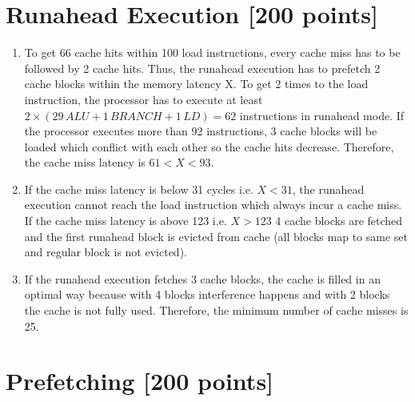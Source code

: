\documentclass[a4paper]{article}
\begin{document}
\section{Runahead Execution [200 points]}

\begin{enumerate}[label=\alph*)]
    \item To get 66 cache hits within 100 load instructions, every cache miss has
        to be followed by 2 cache hits. Thus, the runahead execution has to
        prefetch 2 cache blocks within the memory latency X. To get 2 times to
        the load instruction, the processor has to execute at least $2 \times
        (29 \, ALU + 1 \, BRANCH + 1 \, LD) = 62$ instructions in runahead mode.
        If the processor executes more than 92 instructions, 3 cache blocks
        will be loaded which conflict with each other so the cache hits
        decrease. Therefore, the cache miss latency is $61 < X < 93$.

    \item If the cache miss latency is below 31 cycles i.e. $X < 31$, the
        runahead execution cannot reach the load instruction which always
        incur a cache miss. If the cache miss latency is above 123 i.e. $X
        > 123$ 4 cache blocks are fetched and the first runahead block is
        evicted from cache (all blocks map to same set and regular block is not
        evicted).
    \item If the runahead execution fetches 3 cache blocks, the cache is filled
        in an optimal way because with 4 blocks interference happens and with
        2 blocks the cache is not fully used. Therefore, the minimum number of
        cache misses is 25.
\end{enumerate}

\section{Prefetching [200 points]}
\end{document}
